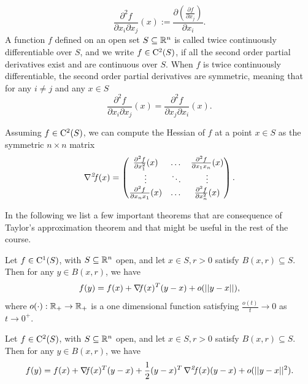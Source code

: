 \documentclass[10pt,a4paper]{article}
\begin{document}
\begin{equation*}
	\frac{\partial^2 f}{\partial x_i \partial x_j}(x) := \frac{\partial \left(\frac{\partial f}{\partial x_j}\right)}{\partial x_i}.
\end{equation*}
A function $f$ defined on an open set $S \subseteq \mathbb{R}^n$ is called twice continuously differentiable over $S$, and we write $f\in \mathord{\mathrm{C^2}}(S)$, if all the second order partial derivatives exist and are continuous over $S$. When $f$ is twice continuously differentiable, the second order partial derivatives are symmetric, meaning that for any $i\neq j$ and any $x\in S$
\begin{equation*}
	\frac{\partial^2 f}{\partial x_i \partial x_j} (x) = \frac{\partial^2f}{\partial x_j \partial x_i} (x).
\end{equation*}
\begin{definition}[Hessian]
	Assuming $f\in \mathord{\mathrm{C^2}}(S)$, we can compute the Hessian of $f$ at a point $x\in S$ as the symmetric $n\times n$ matrix
	\begin{equation*}
		\operatorname*{\mathit{\nabla^2 \!f}} (x) = \begin{pmatrix}
			\frac{\partial^2 f}{\partial x_1^2 } (x) & \dots & \frac{\partial^2 f}{\partial x_1 x_n } (x)\\
			\vdots & \ddots & \vdots\\
			\frac{\partial^2 f}{\partial x_n x_1 } (x) & \dots & \frac{\partial^2 f}{\partial x_n^2 } (x)
		\end{pmatrix}
	.
	\end{equation*}
\end{definition}
\noindent In the following we list a few important theorems that are consequence of Taylor's approximation theorem and that might be useful in the rest of the course. 
\begin{theorem}\label{thm:linear_approx}
	Let $f\in \mathord{\mathrm{C^1}}(S)$, with $S\subseteq \mathbb{R}^n$ open, and let $x\in S, r>0$ satisfy $B(x,r)\subseteq S$. Then for any $y\in B(x,r)$, we have 
	\begin{equation*}
		f(y) = f(x)+ \operatorname*{\mathit{\nabla \!f}} (x)^T(y-x) + o(||y-x||),
	\end{equation*}
where $o(\cdot):\mathbb{R}_+\to \mathbb{R}_+$ is a one dimensional function satisfying $\frac{o(t)}{t} \to 0$ as $t\to0^+$.
\end{theorem}
\begin{theorem}
Let $f\in \mathord{\mathrm{C^2}}(S)$, with $S\subseteq \mathbb{R}^n$ open, and let $x\in S, r>0$ satisfy $B(x,r)\subseteq S$. Then for any $y\in B(x,r)$, we have 
\begin{equation*}
	f(y) = f(x)+ \operatorname*{\mathit{\nabla \!f}} (x)^T(y-x) +\frac{1}{2}(y-x)^T\operatorname*{\mathit{\nabla^2 \!f}}(x)(y-x) +  o(||y-x||^2).
\end{equation*}
\end{theorem}
\end{document}
